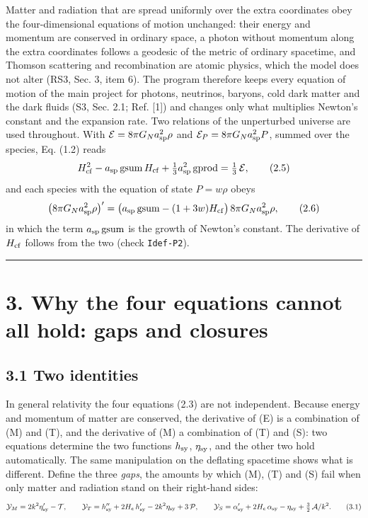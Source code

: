 \documentclass[
  10pt,
]{article}
\begin{document}
Matter and radiation that are spread uniformly over the extra
coordinates obey the four-dimensional equations of motion unchanged:
their energy and momentum are conserved in ordinary space, a photon
without momentum along the extra coordinates follows a geodesic of the
metric of ordinary spacetime, and Thomson scattering and recombination
are atomic physics, which the model does not alter (RS3, Sec. 3, item
6). The program therefore keeps every equation of motion of the main
project for photons, neutrinos, baryons, cold dark matter and the dark
fluids (S3, Sec. 2.1; Ref. {[}1{]}) and changes only what multiplies
Newton's constant and the expansion rate. Two relations of the
unperturbed universe are used throughout. With
\(\mathcal E=8\pi G_N a_{\rm sp}^2\rho\) and
\(\mathcal E_P=8\pi G_N a_{\rm sp}^2P\), summed over the species, Eq.
(1.2) reads
\[H_{\rm cf}^2-a_{\rm sp}\,\mathrm{gsum}\,H_{\rm cf}+\tfrac13a_{\rm sp}^2\,\mathrm{gprod}=\tfrac13\,\mathcal E ,\tag{2.5}\]
and each species with the equation of state \(P=w\rho\) obeys
\[\big(8\pi G_Na_{\rm sp}^2\rho\big)'=\big(a_{\rm sp}\,\mathrm{gsum}-(1+3w)H_{\rm cf}\big)\,8\pi G_Na_{\rm sp}^2\rho ,\tag{2.6}\]
in which the term \(a_{\rm sp}\,\mathrm{gsum}\) is the growth of
Newton's constant. The derivative of \(H_{\rm cf}\) follows from the two
(check \texttt{Idef-P2}).

\begin{center}\rule{0.5\linewidth}{0.5pt}\end{center}

\hypertarget{why-the-four-equations-cannot-all-hold-gaps-and-closures}{%
\section{3. Why the four equations cannot all hold: gaps and
closures}\label{why-the-four-equations-cannot-all-hold-gaps-and-closures}}

\hypertarget{two-identities}{%
\subsection{3.1 Two identities}\label{two-identities}}

In general relativity the four equations (2.3) are not independent.
Because energy and momentum of matter are conserved, the derivative of
(E) is a combination of (M) and (T), and the derivative of (M) a
combination of (T) and (S): two equations determine the two functions
\(h_{\rm sy}\), \(\eta_{\rm sy}\), and the other two hold automatically.
The same manipulation on the deflating spacetime shows what is
different. Define the three \emph{gaps}, the amounts by which (M), (T)
and (S) fail when only matter and radiation stand on their right-hand
sides: \[\mathcal Y_M=2k^2\eta_{\rm sy}'-\mathcal T,\qquad
\mathcal Y_T=h_{\rm sy}''+2H_e\,h_{\rm sy}'-2k^2\eta_{\rm sy}+3\,\mathcal P,\qquad
\mathcal Y_S=\alpha_{\rm sy}'+2H_e\,\alpha_{\rm sy}-\eta_{\rm sy}+\tfrac32\,\mathcal A/k^2 .\tag{3.1}\]
\end{document}
